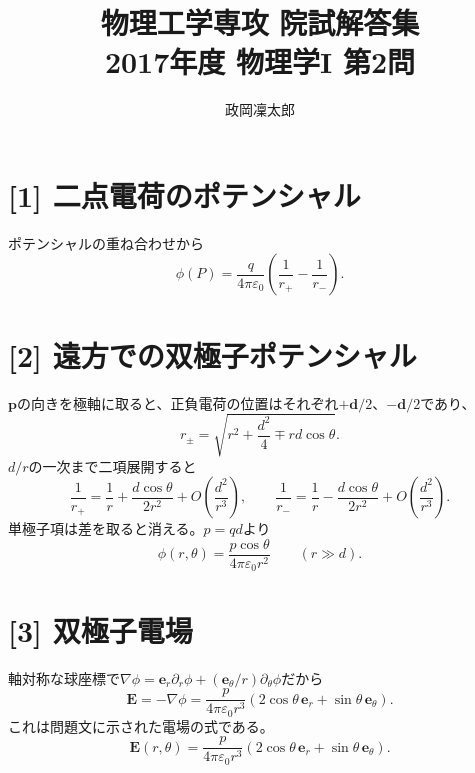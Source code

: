\documentclass[11pt,a4paper]{article}
\title{物理工学専攻 院試解答集\\2017年度 物理学I 第2問}
\author{政岡凜太郎}
\date{}
\begin{document}
\maketitle

\section*{[1] 二点電荷のポテンシャル}
ポテンシャルの重ね合わせから
\begin{equation}
  \boxed{\phi(P)=\frac{q}{4\pi\varepsilon_0}
    \left(\frac1{r_+}-\frac1{r_-}\right)}.
\end{equation}

\section*{[2] 遠方での双極子ポテンシャル}
$\boldsymbol p$の向きを極軸に取ると、正負電荷の位置はそれぞれ$+\boldsymbol d/2$、$-\boldsymbol d/2$であり、
\begin{equation}
  r_\pm=\sqrt{r^2+\frac{d^2}{4}\mp rd\cos\theta}.
\end{equation}
$d/r$の一次まで二項展開すると
\begin{equation}
  \frac1{r_+}=\frac1r+\frac{d\cos\theta}{2r^2}+O\!\left(\frac{d^2}{r^3}\right),\qquad
  \frac1{r_-}=\frac1r-\frac{d\cos\theta}{2r^2}+O\!\left(\frac{d^2}{r^3}\right).
\end{equation}
単極子項は差を取ると消える。$p=qd$より
\begin{equation}
  \boxed{\phi(r,\theta)=\frac{p\cos\theta}{4\pi\varepsilon_0r^2}}
  \qquad (r\gg d).
\end{equation}

\section*{[3] 双極子電場}
軸対称な球座標で$\nabla\phi=\boldsymbol e_r\partial_r\phi+
(\boldsymbol e_\theta/r)\partial_\theta\phi$だから
\begin{equation}
  \boldsymbol E=-\nabla\phi=\frac{p}{4\pi\varepsilon_0r^3}
    \left(2\cos\theta\,\boldsymbol e_r+\sin\theta\,\boldsymbol e_\theta\right).
\end{equation}
これは問題文に示された電場の式である。
\begin{equation}
  \boxed{\boldsymbol E(r,\theta)=\frac{p}{4\pi\varepsilon_0r^3}
    \left(2\cos\theta\,\boldsymbol e_r+\sin\theta\,\boldsymbol e_\theta\right)}.
\end{equation}
\end{document}
